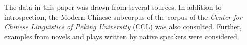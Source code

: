 The data in this paper was drawn from several sources.
In addition to introspection, the Modern Chinese subcorpus of the corpus of the \textit{Center for Chinese Linguistics of Peking University} ({CCL}) \citep{Zhanetal2003, Zhanetal2019} was also consulted. 
Further, examples from novels and plays written by native speakers were considered.